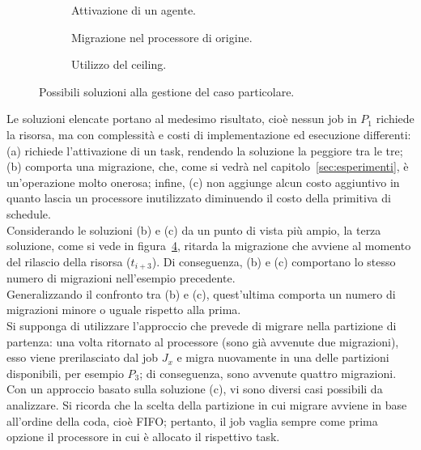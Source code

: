   \begin{figure}
    \centering
      \begin{subfigure}[b]{0.99\textwidth}
        \centering
        \resizebox{\linewidth}{!}\agentSolution
        \caption{Attivazione di un agente.}
        \label{fig:agent_solution}
      \end{subfigure}
      \begin{subfigure}[b]{0.99\textwidth}
        \centering
        \resizebox{\linewidth}{!}\migrationSolution
        \caption{Migrazione nel processore di origine.}
        \label{fig:migration_solution}
      \end{subfigure}
      \begin{subfigure}[b]{0.99\textwidth}
        \centering
        \resizebox{\linewidth}{!}\ceilingSolution
        \caption{Utilizzo del ceiling.}
        \label{fig:ceilin_solution}
      \end{subfigure}
    \caption{Possibili soluzioni alla gestione del caso particolare.}
    \label{fig:solutions}
  \end{figure}

Le soluzioni elencate portano al medesimo risultato, cioè nessun job in $P_1$ richiede la risorsa, ma con complessità e costi di implementazione ed esecuzione differenti: (a) richiede l'attivazione di un task, rendendo la soluzione la peggiore tra le tre; (b) comporta una migrazione, che, come si vedrà nel capitolo~\ref{sec:esperimenti}, è un'operazione molto onerosa; infine, (c) non aggiunge alcun costo aggiuntivo in quanto lascia un processore inutilizzato diminuendo il costo della primitiva di schedule.\\

Considerando le soluzioni (b) e (c) da un punto di vista più  ampio, la terza soluzione, come si vede in figura~\ref{fig:solutions}, ritarda la migrazione che avviene al momento del rilascio della risorsa ($t_{i+3}$). Di conseguenza, (b) e (c) comportano lo stesso numero di migrazioni nell'esempio precedente.\\

Generalizzando il confronto tra (b) e (c), quest'ultima comporta un numero di migrazioni minore o uguale rispetto alla prima.\\
Si supponga di utilizzare l'approccio che prevede di migrare nella partizione di partenza: una volta ritornato al processore (sono già avvenute due migrazioni), esso viene prerilasciato dal job $J_x$ e migra nuovamente in una delle partizioni disponibili, per esempio $P_3$; di conseguenza, sono avvenute quattro migrazioni. Con un approccio basato sulla soluzione (c), vi sono diversi casi possibili da analizzare. Si ricorda che la scelta della partizione in cui migrare avviene in base all'ordine della coda, cioè FIFO; pertanto, il job vaglia sempre come prima opzione il processore in cui è allocato il rispettivo task.

